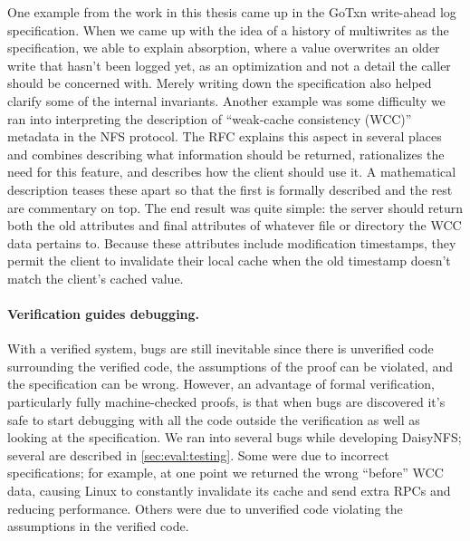 One example from the work in this thesis came up in the GoTxn write-ahead log
specification. When we came up with the idea of a history of multiwrites as the
specification, we able to explain absorption, where a value overwrites an older
write that hasn't been logged yet, as an optimization and not a detail the
caller should be concerned with. Merely writing down the specification also
helped clarify some of the internal invariants. Another example was some
difficulty we ran into interpreting the description of ``weak-cache consistency
(WCC)'' metadata in the NFS protocol. The RFC explains this aspect in several
places and combines describing what information should be returned, rationalizes
the need for this feature, and describes how the client should use it. A
mathematical description teases these apart so that the first is formally
described and the rest are commentary on top. The end result was quite simple:
the server should return both the old attributes and final attributes of
whatever file or directory the WCC data pertains to. Because these attributes
include modification timestamps, they permit the client to invalidate their
local cache when the old timestamp doesn't match the client's cached value.

\paragraph{Verification guides debugging.} With a verified system, bugs are
still inevitable since there is unverified code surrounding the verified code,
the assumptions of the proof can be violated, and the specification can be
wrong. However, an advantage of formal verification, particularly fully
machine-checked proofs, is that when bugs are discovered it's safe to start
debugging with all the code outside the verification as well as looking at the
specification. We ran into several bugs while developing DaisyNFS; several are
described in \cref{sec:eval:testing}. Some were due
to incorrect specifications; for example, at one point we returned the wrong
``before'' WCC data, causing Linux to constantly invalidate its cache and send
extra RPCs and reducing performance. Others were due to unverified code
violating the assumptions in the verified code.


